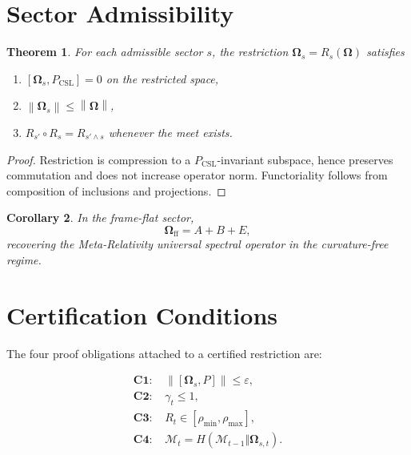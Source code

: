 \documentclass[11pt]{article}
\theoremstyle{plain}
\newtheorem{theorem}{Theorem}[section]
\newtheorem{corollary}[theorem]{Corollary}
\theoremstyle{definition}
\theoremstyle{remark}
\newcommand{\Om}{\boldsymbol{\Omega}}
\newcommand{\PCSL}{P_{\mathrm{CSL}}}
\newcommand{\norm}[1]{\left\lVert #1 \right\rVert}
\begin{document}
\section{Sector Admissibility}

\begin{theorem}
For each admissible sector \(s\), the restriction \(\Om_s=R_s(\Om)\) satisfies
\begin{enumerate}[label=(\roman*)]
    \item \( [\Om_s,\PCSL]=0 \) on the restricted space,
    \item \( \norm{\Om_s}\le \norm{\Om} \),
    \item \(R_{s'}\circ R_s = R_{s'\wedge s}\) whenever the meet exists.
\end{enumerate}
\end{theorem}

\begin{proof}
Restriction is compression to a \(\PCSL\)-invariant subspace, hence preserves commutation and does not increase operator norm. Functoriality follows from composition of inclusions and projections.
\end{proof}

\begin{corollary}
In the frame-flat sector,
\[
\Om_{\mathrm{ff}} = A+B+E,
\]
recovering the Meta-Relativity universal spectral operator in the curvature-free regime.
\end{corollary}

\section{Certification Conditions}

The four proof obligations attached to a certified restriction are:

\begin{align*}
\textbf{C1: } &\norm{[\Om_s,P]} \le \varepsilon,\\
\textbf{C2: } &\gamma_t \le 1,\\
\textbf{C3: } &R_t \in [\rho_{\min},\rho_{\max}],\\
\textbf{C4: } &\mathcal{M}_t = H(\mathcal{M}_{t-1}\Vert \Om_{s,t}).
\end{align*}
\end{document}
